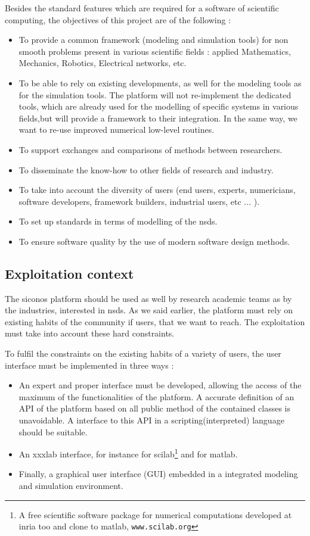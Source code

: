   Besides the standard features which are required for a software of scientific computing, the objectives of this project are of the following :
\begin{itemize}
\item To provide a common framework (modeling and simulation tools) for non smooth problems present in various scientific fields : applied Mathematics, Mechanics, Robotics, Electrical networks, etc. 
\item To be able to rely on existing developments, as well for the modeling tools as for the simulation tools. The platform will not re-implement the dedicated tools, which are already used  for the modelling of specific systems in various fields,but will provide a framework to their integration. In the same way, we want to re-use improved numerical low-level routines.
\item To support exchanges and comparisons of methods between researchers.
\item To disseminate the know-how to other fields of research and industry.
\item To take into account the diversity of users (end users,  experts, numericians, software developers, framework builders, industrial users, etc ... ).
\item To set up standards in terms of modelling of the \ac{nsds}.
\item To ensure software quality by the use of modern software design methods.
\end{itemize}



\subsection{Exploitation context}
The \ac{siconos} platform should be used as well by research academic teams as by the industries, interested in \ac{nsds}. As we said earlier, the platform must rely on existing habits of the community if users, that we want to reach. The exploitation must take into account  these hard constraints.

 To fulfil the constraints on the existing habits of a variety of users, the user interface must be implemented in three ways : 
\begin{itemize}
\item An expert and proper interface must be developed, allowing the access of the maximum of the functionalities of the platform. A accurate definition of an API of the platform based on all public method of the contained classes is unavoidable. A interface to this API in a scripting(interpreted) language should be suitable. 
\item An \ac{xxxlab} interface, for instance for  \ac{scilab}\footnote{A free scientific software package for numerical computations developed at \ac{inria} too and clone to \ac{matlab}, \texttt{www.scilab.org}} and for \ac{matlab}.
\item Finally, a graphical  user interface (GUI) embedded in a integrated modeling and simulation environment.
\end{itemize}

